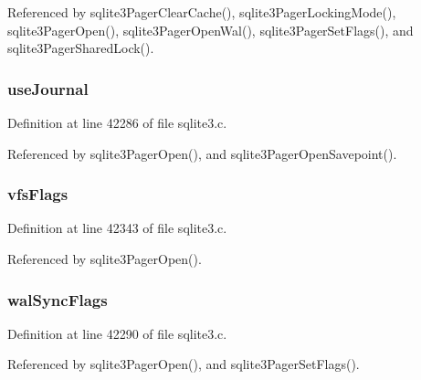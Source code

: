 Referenced by sqlite3\+Pager\+Clear\+Cache(), sqlite3\+Pager\+Locking\+Mode(), sqlite3\+Pager\+Open(), sqlite3\+Pager\+Open\+Wal(), sqlite3\+Pager\+Set\+Flags(), and sqlite3\+Pager\+Shared\+Lock().

\hypertarget{struct_pager_a931b7472041e2b8b26dfc9a52c16b108}{}
\subsubsection[{use\+Journal}]{ use\+Journal}\label{struct_pager_a931b7472041e2b8b26dfc9a52c16b108}


Definition at line 42286 of file sqlite3.\+c.



Referenced by sqlite3\+Pager\+Open(), and sqlite3\+Pager\+Open\+Savepoint().

\hypertarget{struct_pager_a8549852e04ca6a05bf6c18e1e8148ccb}{}
\subsubsection[{vfs\+Flags}]{ vfs\+Flags}\label{struct_pager_a8549852e04ca6a05bf6c18e1e8148ccb}


Definition at line 42343 of file sqlite3.\+c.



Referenced by sqlite3\+Pager\+Open().

\hypertarget{struct_pager_a754c6f3e9c986c552655557f044109e2}{}
\subsubsection[{wal\+Sync\+Flags}]{ wal\+Sync\+Flags}\label{struct_pager_a754c6f3e9c986c552655557f044109e2}


Definition at line 42290 of file sqlite3.\+c.



Referenced by sqlite3\+Pager\+Open(), and sqlite3\+Pager\+Set\+Flags().

\hypertarget{struct_pager_a3c0ec4b23e5e61ba3ee7ae2021ed6128}{}
